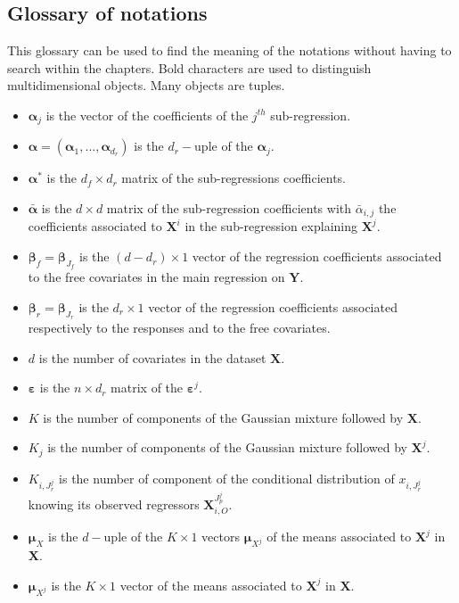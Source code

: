 \documentclass[12pt,a4paper]{report}
\begin{document}
\begin{appendices}
\chapter{Glossary of notations}
This glossary can be used to find the meaning of the notations without having to search within the chapters.
Bold characters are used to distinguish multidimensional objects. Many objects are tuples.
\begin{itemize}
	\item $\boldsymbol{\alpha}_j$ is the vector of the coefficients of the $j^{th}$ sub-regression.
	\item $\boldsymbol{\alpha}=(\boldsymbol{\alpha}_1,\dots,\boldsymbol{\alpha}_{d_r})$ is the $d_r-$uple of the $\boldsymbol{\alpha}_j$.
	\item $\boldsymbol{\alpha}^*$ is the $d_f \times d_r $ matrix of the sub-regressions coefficients.
	\item $\bar{\boldsymbol{\alpha}}$ is the $d\times d$ matrix of the sub-regression coefficients with $\bar{\alpha}_{i,j}$ the coefficients associated to $\boldsymbol{X}^i$ in the sub-regression explaining $\boldsymbol{X}^j$.
	\item $\boldsymbol{\beta}_f=\boldsymbol{\beta}_{J_f}$ is the $(d-d_r)\times 1$ vector of the regression coefficients associated  to the free covariates in the main regression on $\boldsymbol{Y}$.
	\item $\boldsymbol{\beta}_r=\boldsymbol{\beta}_{J_r}$ is the $d_r\times 1$ vector of the regression coefficients associated respectively to the responses and to the free covariates.
	\item $d$ is the number of covariates in the dataset $\boldsymbol{X}$.
	\item $\boldsymbol{\varepsilon}$ is the $n\times d_r$ matrix of the $\boldsymbol{\varepsilon}^j$.
	\item $K$ is the number of components of the Gaussian mixture followed by $\boldsymbol{X}$.
	\item $K_j$ is the number of components of the Gaussian mixture followed by $\boldsymbol{X}^j$.
	\item $K_{i,J_r^j}$ is the number of component of the conditional distribution of $x_{i,J_r^j}$ knowing its observed regressors $\boldsymbol{X}_{i,O}^{J_p^j}$.
	\item $\boldsymbol{\mu}_X$ is the $d-$uple of the $K \times 1$ vectors $\boldsymbol{\mu}_{X^j}$ of the means associated to $\boldsymbol{X}^j$ in $\boldsymbol{X}$.
	\item $\boldsymbol{\mu}_{X^j}$ is the $K \times 1$ vector of the means associated to $\boldsymbol{X}^j$ in $\boldsymbol{X}$.

\end{itemize}
\end{appendices}
\end{document}
